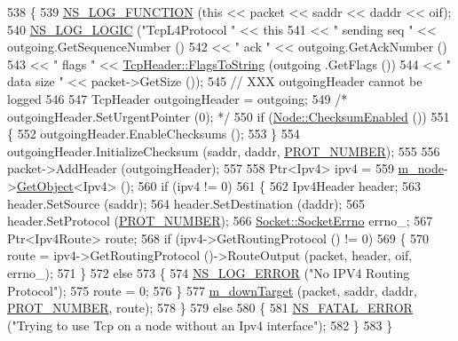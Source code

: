 \begin{DoxyCode}
538 \{
539   \hyperlink{log-macros-disabled_8h_a90b90d5bad1f39cb1b64923ea94c0761}{NS\_LOG\_FUNCTION} (\textcolor{keyword}{this} << packet << saddr << daddr << oif);
540   \hyperlink{group__logging_ga88acd260151caf2db9c0fc84997f45ce}{NS\_LOG\_LOGIC} (\textcolor{stringliteral}{"TcpL4Protocol "} << \textcolor{keyword}{this}
541                                  << \textcolor{stringliteral}{" sending seq "} << outgoing.GetSequenceNumber ()
542                                  << \textcolor{stringliteral}{" ack "} << outgoing.GetAckNumber ()
543                                  << \textcolor{stringliteral}{" flags "} << \hyperlink{classns3_1_1TcpHeader_aaaa261ca12b0fb50e45c7083cec88cff}{TcpHeader::FlagsToString} (outgoing
      .GetFlags ())
544                                  << \textcolor{stringliteral}{" data size "} << packet->GetSize ());
545   \textcolor{comment}{// XXX outgoingHeader cannot be logged}
546 
547   TcpHeader outgoingHeader = outgoing;
549   \textcolor{comment}{/* outgoingHeader.SetUrgentPointer (0); */}
550   \textcolor{keywordflow}{if} (\hyperlink{classns3_1_1Node_a0515bfe9a3aeb6605d657ba855699815}{Node::ChecksumEnabled} ())
551     \{
552       outgoingHeader.EnableChecksums ();
553     \}
554   outgoingHeader.InitializeChecksum (saddr, daddr, \hyperlink{classns3_1_1TcpL4Protocol_ac6c1cee44ae21227e755678bb52dbc89}{PROT\_NUMBER});
555 
556   packet->AddHeader (outgoingHeader);
557 
558   Ptr<Ipv4> ipv4 =
559     \hyperlink{classns3_1_1TcpL4Protocol_a89e39fd5367f8ce22565f69e224de189}{m\_node}->\hyperlink{classns3_1_1Object_a13e18c00017096c8381eb651d5bd0783}{GetObject}<Ipv4> ();
560   \textcolor{keywordflow}{if} (ipv4 != 0)
561     \{
562       Ipv4Header header;
563       header.SetSource (saddr);
564       header.SetDestination (daddr);
565       header.SetProtocol (\hyperlink{classns3_1_1TcpL4Protocol_ac6c1cee44ae21227e755678bb52dbc89}{PROT\_NUMBER});
566       \hyperlink{classns3_1_1Socket_ada1328c5ae0c28cb2a982caf8f6d6cca}{Socket::SocketErrno} errno\_;
567       Ptr<Ipv4Route> route;
568       \textcolor{keywordflow}{if} (ipv4->GetRoutingProtocol () != 0)
569         \{
570           route = ipv4->GetRoutingProtocol ()->RouteOutput (packet, header, oif, errno\_);
571         \}
572       \textcolor{keywordflow}{else}
573         \{
574           \hyperlink{group__logging_ga0261a8db1d4ac5f79417d117634fd455}{NS\_LOG\_ERROR} (\textcolor{stringliteral}{"No IPV4 Routing Protocol"});
575           route = 0;
576         \}
577       \hyperlink{classns3_1_1TcpL4Protocol_a6624133b0d5072cacbd77c9dc90aee75}{m\_downTarget} (packet, saddr, daddr, \hyperlink{classns3_1_1TcpL4Protocol_ac6c1cee44ae21227e755678bb52dbc89}{PROT\_NUMBER}, route);
578     \}
579   \textcolor{keywordflow}{else}
580     \{
581       \hyperlink{group__fatal_ga5131d5e3f75d7d4cbfd706ac456fdc85}{NS\_FATAL\_ERROR} (\textcolor{stringliteral}{"Trying to use Tcp on a node without an Ipv4 interface"});
582     \}
583 \}
\end{DoxyCode}


